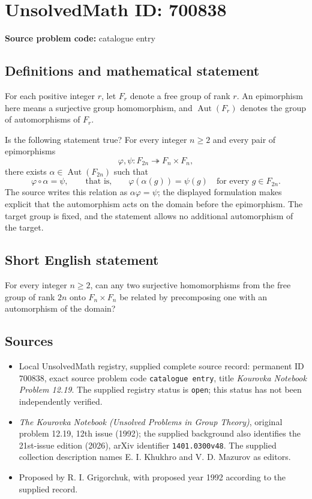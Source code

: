 \documentclass[11pt]{article}
\begin{document}
\section*{UnsolvedMath ID: 700838}
\textbf{Source problem code:} catalogue entry
\subsection{Definitions and mathematical statement}
For each positive integer \(r\), let \(F_r\) denote a free group of rank \(r\). An epimorphism here means a surjective group homomorphism, and \(\operatorname{Aut}(F_r)\) denotes the group of automorphisms of \(F_r\).

Is the following statement true? For every integer \(n\geq 2\) and every pair of epimorphisms
\[
\varphi,\psi:F_{2n}\twoheadrightarrow F_n\times F_n,
\]
there exists \(\alpha\in\operatorname{Aut}(F_{2n})\) such that
\[
\varphi\circ\alpha=\psi,
\qquad\text{that is,}\qquad
\varphi(\alpha(g))=\psi(g)\quad\text{for every }g\in F_{2n}.
\]
The source writes this relation as \(\alpha\varphi=\psi\); the displayed formulation makes explicit that the automorphism acts on the domain before the epimorphism. The target group is fixed, and the statement allows no additional automorphism of the target.
\subsection{Short English statement}
For every integer \(n\geq 2\), can any two surjective homomorphisms from the free group of rank \(2n\) onto \(F_n\times F_n\) be related by precomposing one with an automorphism of the domain?
\subsection{Sources}
\begin{itemize}
\item Local UnsolvedMath registry, supplied complete source record: permanent ID \(700838\), exact source problem code \texttt{catalogue entry}, title \emph{Kourovka Notebook Problem 12.19}. The supplied registry status is \texttt{open}; this status has not been independently verified.
\item \emph{The Kourovka Notebook (Unsolved Problems in Group Theory)}, original problem 12.19, 12th issue (1992); the supplied background also identifies the 21st-issue edition (2026), arXiv identifier \texttt{1401.0300v48}. The supplied collection description names E. I. Khukhro and V. D. Mazurov as editors.
\item Proposed by R. I. Grigorchuk, with proposed year 1992 according to the supplied record.
\end{itemize}
\end{document}
